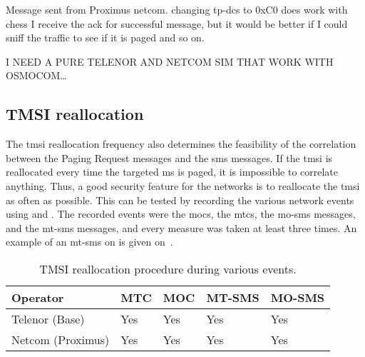       Message sent from Proximus netcom.
      changing tp-dcs to 0xC0 does work with chess
      I receive the ack for successful message, but it would be better
      if I could sniff the traffic to see if it is paged and so on.

      I NEED A PURE TELENOR AND NETCOM SIM THAT WORK WITH OSMOCOM…
      \fi

    \iffalse
      http://comments.gmane.org/gmane.comp.mobile.osmocom.baseband.devel/2408
      Hei,
      consider also, that some operators detects silent sms and
      restores automatically TP-PID and TP-DCS.

      Moreover changing TP-PID/TP-DCS I suggest you to use also
      Message Waiting Indication-Discard option [1].

      Some examples: 

      #pdu='0011000C91'+str(num)+'0000AA0141'        # SMS Classic
      #pdu='0011000C91'+str(num)+'4000AA0141'        # 0x40 (TP-PID) 
      #pdu='0011000C91'+str(num)+'40C0AA0141'   # 0x40(TP-PID) and
      0xC0(Message Waiting Indication-Discard)

      Cheers,
      Luca
      \fi


    \subsection{TMSI reallocation}
    \label{sec:tmsi_realloc}

      The \gls{tmsi} reallocation frequency also determines the
      feasibility of the correlation between the Paging Request messages
      and the \gls{sms} messages. If the \gls{tmsi} is reallocated every
      time the targeted \gls{ms} is paged, it is impossible to correlate
      anything. Thus, a good security feature for the networks is to
      reallocate the \gls{tmsi} as often as possible. This can be tested
      by recording the various network events using  and
      . The recorded events were the \glspl{moc}, the
      \glspl{mtc}, the \gls{mo-sms} messages, and the \gls{mt-sms}
      messages, and every measure was taken at least three times. An
      example of an \gls{mt-sms} on  is given
      on~.

      \begin{table}[h]
        \centering
        \begin{tabular}{@{}lllll@{}}
          \toprule
          Operator          & MTC & MOC & MT-SMS & MO-SMS \\
          \midrule
          Telenor (Base)    & Yes & Yes & Yes    & Yes    \\
          Netcom (Proximus) & Yes & Yes & Yes    & Yes    \\
          \bottomrule
        \end{tabular}
        \caption{TMSI reallocation procedure during various events.}
        \label{tab:events_tmsi_reallocation}
      \end{table}

